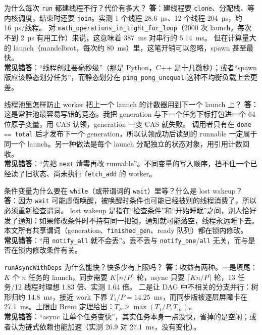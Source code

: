 \documentclass[11pt,a4paper]{ctexart}
\begin{document}
\begin{iqbox}{为什么每次 \texttt{run} 都建线程不行？代价有多大？}
\textbf{答}：建线程要 \texttt{clone}、分配栈、等内核调度，结束时还要 \texttt{join}。实测 1 个线程 28.6~µs、12 个线程 204~µs，约 16~µs/线程。
对 \texttt{math\_\allowbreak{}operations\_\allowbreak{}in\_\allowbreak{}tight\_\allowbreak{}for\_\allowbreak{}loop}（2000 次 launch，每次不到 2~µs 有用工作）来说，这意味着 387~ms 对串行的 5.14~ms。
但在计算量大的 launch（mandelbrot，每次约 80~ms）里，这笔开销可以忽略，spawn 甚至最快。\\
\textbf{常见错答}：``线程创建要毫秒级''（那是 Python，C++ 是十几微秒）；或者``spawn 版应该静态划分任务''，而静态划分在 \texttt{ping\_\allowbreak{}pong\_\allowbreak{}unequal} 这种不均衡负载上会更差。
\end{iqbox}

\begin{iqbox}{线程池里怎样防止 worker 把上一个 launch 的计数器用到下一个 launch 上？}
\textbf{答}：这是常驻池最容易写错的竞态。我把 generation 与下一个任务下标打包进一个 64 位原子变量，用 CAS 认领，generation 一变 CAS 就失败。
调用者只有在 \texttt{done == total} 后才发布下一个 generation，所以认领成功后读到的 runnable 一定属于同一个 launch。另一种做法是每个 launch 分配独立的状态对象，用引用计数回收。\\
\textbf{常见错答}：``先把 \texttt{next} 清零再改 runnable''。不同变量的写入顺序，挡不住一个已经读了旧状态、尚未执行 \texttt{fetch\_\allowbreak{}add} 的 worker。
\end{iqbox}

\begin{iqbox}{条件变量为什么要在 \texttt{while}（或带谓词的 \texttt{wait}）里等？什么是 lost wakeup？}
\textbf{答}：因为 \texttt{wait} 可能虚假唤醒，被唤醒时条件也可能已经被别的线程消费了，所以必须重新检查谓词。
lost wakeup 是指在``检查条件''和``开始睡眠''之间，别人恰好发了通知：如果修改条件时不持有同一把锁，通知就可能落空，线程永远睡下去。
本文所有共享谓词（generation、\texttt{finished\_\allowbreak{}gen}、ready 队列）都在锁内修改。\\
\textbf{常见错答}：``用 \texttt{notify\_\allowbreak{}all} 就不会丢''。丢不丢与 \texttt{notify\_\allowbreak{}one}/\texttt{all} 无关，而与是否在锁内修改条件有关。
\end{iqbox}

\begin{iqbox}{\texttt{runAsyncWithDeps} 为什么能快？快多少有上限吗？}
\textbf{答}：收益有两种。一是填尾：$K$ 个 $n$ 任务的 launch，同步需要 $K\lceil n/P\rceil$ 轮，async 只要 $\lceil Kn/P\rceil$ 轮，13 任务/12 线程时理想 1.83 倍、实测 1.64 倍。
二是让 DAG 中不相关的分支并行：树形归约 14.8~ms，接近 work 下界 $T_1/P = 14.25$~ms，而同步版被逐层屏障卡在 27.1~ms。上限由 Brent 定理给出：$T_P \ge \max(T_1/P, T_\infty)$。\\
\textbf{常见错答}：``async 让单个任务变快''，其实任务本身一点没快，省掉的是空闲；或者认为链式依赖也能加速（实测 26.9 对 27.1~ms，没有变化）。
\end{iqbox}
\end{document}
